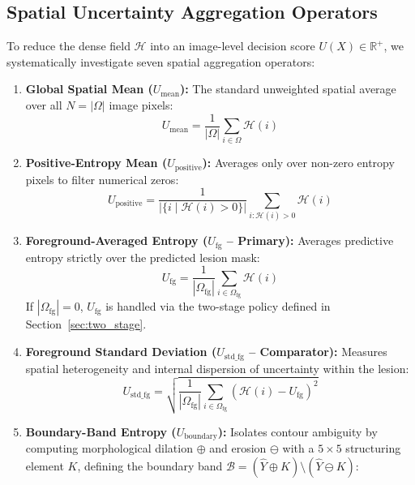 \documentclass[10pt,journal,compsoc]{IEEEtran}
\begin{document}
\subsection{Spatial Uncertainty Aggregation Operators}
To reduce the dense field $\mathcal{H}$ into an image-level decision score $U(X) \in \mathbb{R}^+$, we systematically investigate seven spatial aggregation operators:

\begin{enumerate}
    \item \textbf{Global Spatial Mean ($U_{\mathrm{mean}}$):} The standard unweighted spatial average over all $N = |\Omega|$ image pixels:
    \begin{equation}
    U_{\mathrm{mean}} = \frac{1}{|\Omega|} \sum_{i \in \Omega} \mathcal{H}(i)
    \end{equation}
    \item \textbf{Positive-Entropy Mean ($U_{\mathrm{positive}}$):} Averages only over non-zero entropy pixels to filter numerical zeros:
    \begin{equation}
    U_{\mathrm{positive}} = \frac{1}{|\{i \mid \mathcal{H}(i) > 0\}|} \sum_{i: \mathcal{H}(i) > 0} \mathcal{H}(i)
    \end{equation}
    \item \textbf{Foreground-Averaged Entropy ($U_{\mathrm{fg}}$ -- Primary):} Averages predictive entropy strictly over the predicted lesion mask:
    \begin{equation}
    U_{\mathrm{fg}} = \frac{1}{|\Omega_{\mathrm{fg}}|} \sum_{i \in \Omega_{\mathrm{fg}}} \mathcal{H}(i)
    \end{equation}
    If $|\Omega_{\mathrm{fg}}| = 0$, $U_{\mathrm{fg}}$ is handled via the two-stage policy defined in Section~\ref{sec:two_stage}.
    \item \textbf{Foreground Standard Deviation ($U_{\mathrm{std\_fg}}$ -- Comparator):} Measures spatial heterogeneity and internal dispersion of uncertainty within the lesion:
    \begin{equation}
    U_{\mathrm{std\_fg}} = \sqrt{\frac{1}{|\Omega_{\mathrm{fg}}|} \sum_{i \in \Omega_{\mathrm{fg}}} \left(\mathcal{H}(i) - U_{\mathrm{fg}}\right)^2}
    \end{equation}
    \item \textbf{Boundary-Band Entropy ($U_{\mathrm{boundary}}$):} Isolates contour ambiguity by computing morphological dilation $\oplus$ and erosion $\ominus$ with a $5 \times 5$ structuring element $K$, defining the boundary band $\mathcal{B} = (\hat{Y} \oplus K) \setminus (\hat{Y} \ominus K)$:

\end{enumerate}
\end{document}
